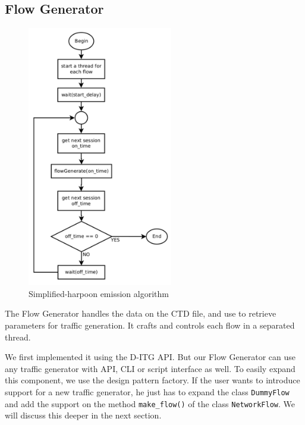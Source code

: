 
\subsection{Flow Generator}

\begin{figure}[ht!]
    \centering
    \includegraphics[height=4.5in]{figures/ch3/alg-simplified-harpoon}
    \caption{Simplified-harpoon emission algorithm}
    \label{fig:alg-simplified-harpoon}
\end{figure}

The Flow Generator handles the data on the CTD file, and use to retrieve parameters for traffic generation. It crafts and controls each flow in a separated thread. 

We first implemented it using the D-ITG API. But our Flow Generator can use any traffic generator with API, CLI or script interface as well. To easily expand this component, we use the design pattern factory. If the user wants to introduce support for a new traffic generator, he just has to expand the class \texttt{DummyFlow} and add the support on the method \texttt{make\_flow()} of the class \texttt{NetworkFlow}. We will discuss this deeper in the next section.

